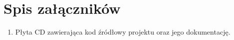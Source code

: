 \documentclass[a4paper,11pt,twoside]{report}
\theoremstyle{definition}
\begin{document}
\listoffigures
\thispagestyle{empty}


\renewcommand{\listtablename}{Spis tabel}
\listoftables
\thispagestyle{empty}



\chapter*{Spis załączników}

\begin{enumerate}
\item Płyta CD zawierająca kod źródłowy projektu oraz jego dokumentację.
\end{enumerate}
\thispagestyle{empty}
\end{document}
